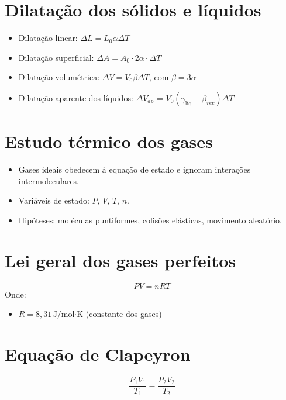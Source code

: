 \documentclass[a4paper,12pt]{article}
\begin{document}
\begin{multicols}{2}
\section{Dilatação dos sólidos e líquidos}
\begin{itemize}
    \item Dilatação linear: $\Delta L = L_0 \alpha \Delta T$
    \item Dilatação superficial: $\Delta A = A_0 \cdot 2\alpha \cdot \Delta T$
    \item Dilatação volumétrica: $\Delta V = V_0 \beta \Delta T$, com $\beta = 3\alpha$
    \item Dilatação aparente dos líquidos: $\Delta V_{ap}$  = $V_0 (\gamma_{\text{líq}} -\beta_{rec}) \Delta T$
\end{itemize}

\section{Estudo térmico dos gases}
\begin{itemize}
    \item Gases ideais obedecem à equação de estado e ignoram interações intermoleculares.
    \item Variáveis de estado: $P$, $V$, $T$, $n$.
    \item Hipóteses: moléculas puntiformes, colisões elásticas, movimento aleatório.
\end{itemize}

\section{Lei geral dos gases perfeitos}
\begin{equation*}
    PV = nRT
\end{equation*}
Onde:
\begin{itemize}
    \item $R = 8{,}31 \, \text{J/mol·K}$ (constante dos gases)
\end{itemize}

\section{Equação de Clapeyron}
\begin{equation*}
    \frac{P_1V_1}{T_1} = \frac{P_2V_2}{T_2}
\end{equation*}


\end{multicols}
\end{document}
